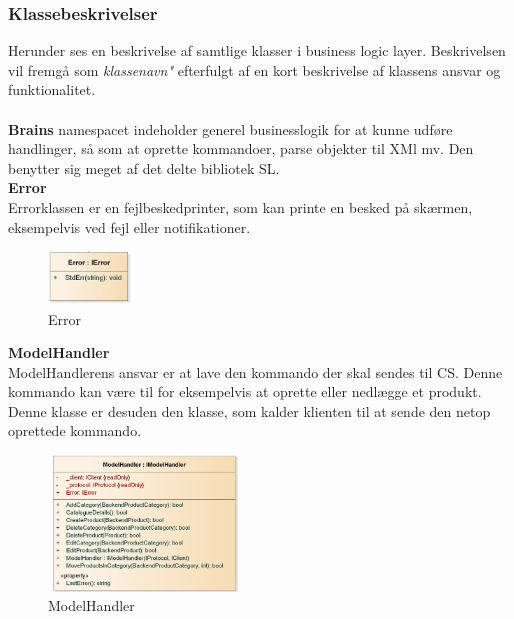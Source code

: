 \subsubsection{Klassebeskrivelser}

Herunder ses en  beskrivelse af samtlige klasser i business logic layer. Beskrivelsen vil fremgå som \textit{klassenavn"} efterfulgt af en kort beskrivelse af klassens ansvar og funktionalitet.\\\\

\textbf{Brains} namespacet indeholder generel businesslogik for at kunne udføre handlinger, så som at oprette kommandoer, parse objekter til XMl mv. Den benytter sig meget af det delte bibliotek \gls{SL}.\\


\textbf{Error}\\
Errorklassen er en fejlbeskedprinter, som kan printe en besked på skærmen, eksempelvis ved fejl eller notifikationer.
\begin{center}
\begin{figure}[!h]
    \centering
    \includegraphics[width=0.2\textwidth]{Systemdesign/backend/klassebeskrivelser/Images/Error.png}
    \caption{Error}
    \label{fig:error}
\end{figure}
\end{center}
 \bigskip 
 
 
 
 
 
 
 


\textbf{ModelHandler}\\
ModelHandlerens ansvar er at lave den kommando der skal sendes til \gls{CS}. Denne kommando kan være til for eksempelvis at oprette eller nedlægge et produkt. Denne klasse er desuden den klasse, som kalder klienten til at sende den netop oprettede kommando. 
\begin{center}
\begin{figure}[!h]
    \centering
    \includegraphics[width=0.45\textwidth]{Systemdesign/backend/klassebeskrivelser/Images/ModelHandler.png}
    \caption{ModelHandler}
    \label{fig:modelhandlerreal}
\end{figure}
\end{center}
\label{Modelhandler_Beskrivelse}
 \bigskip
 
